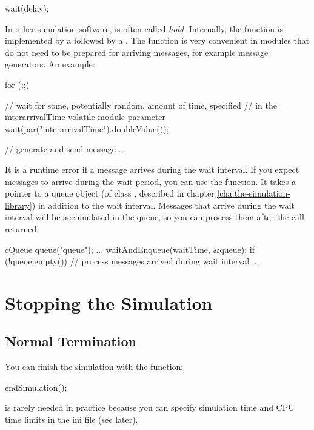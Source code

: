 \begin{cpp}
wait(delay);
\end{cpp}

In other simulation software,  is often called \textit{hold}.
Internally, the  function is implemented by a
 followed by a .
The  function is very convenient in modules that do not need
to be prepared for arriving messages, for example message generators.
An example:

\begin{cpp}
for (;;)
{
    // wait for some, potentially random, amount of time, specified
    // in the interarrivalTime volatile module parameter
    wait(par("interarrivalTime").doubleValue());

    // generate and send message
    ...
}
\end{cpp}

It is a runtime error if a message arrives during the wait interval.
If you expect messages to arrive during the wait period, you can
use the  function. It takes a pointer to a queue object
(of class , described in chapter \ref{cha:the-simulation-library})
in addition to the wait interval. Messages that arrive during the
wait interval will be accumulated in the queue, so you can
process them after the  call returned.

\begin{cpp}
cQueue queue("queue");
...
waitAndEnqueue(waitTime, &queue);
if (!queue.empty())
{
    // process messages arrived during wait interval
    ...
}
\end{cpp}


\section{Stopping the Simulation}
\label{sec:simple-modules:stopping}

\subsection{Normal Termination}

You can finish the simulation with the  function:

\begin{cpp}
endSimulation();
\end{cpp}

 is rarely needed in practice because you
can specify simulation time and CPU time limits
in the ini file (see later).

